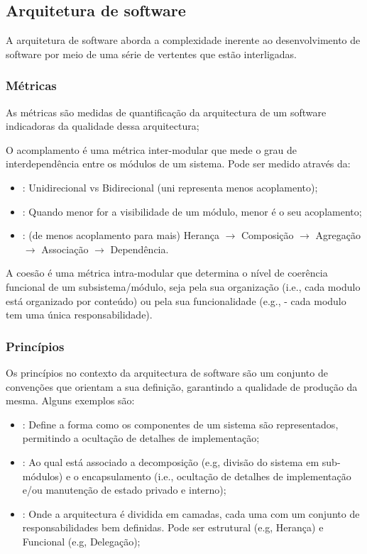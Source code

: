 \subsection{Arquitetura de software}\label{subsec:arquitetura-de-software}

A arquitetura de software aborda a complexidade inerente ao desenvolvimento de software por meio de uma série de vertentes que estão interligadas. 

\subsubsection{Métricas}\label{subsubsec:acoplamento}

As métricas são medidas de quantificação da arquitectura de um software indicadoras da qualidade dessa arquitectura;

O acomplamento é uma métrica inter-modular que mede o grau de interdependência entre os módulos de um sistema. Pode ser medido através da:
\begin{itemize}[topsep=0pt,itemsep=0pt,partopsep=0pt, parsep=0pt]
    \item {}: Unidirecional vs Bidirecional (uni representa menos acoplamento);
    \item {}: Quando menor for a visibilidade de um módulo, menor é o  seu acoplamento;
    \item {}: (de menos acoplamento para mais) Herança $\rightarrow$ Composição $\rightarrow$ Agregação $\rightarrow$ Associação $\rightarrow$ Dependência.
\end{itemize}

A coesão é uma métrica intra-modular que determina o nível de coerência funcional de um subsistema/módulo, seja pela sua organização (i.e., cada modulo está organizado por conteúdo) ou pela sua funcionalidade (e.g.,  - cada modulo tem uma única responsabilidade).

\subsubsection{Princípios}\label{subsubsec:principios}

Os princípios no contexto da arquitectura de software são um conjunto de convenções que orientam a sua definição, garantindo a qualidade de produção da mesma. Alguns exemplos são:
\begin{itemize}[topsep=0pt,itemsep=0pt,partopsep=0pt, parsep=0pt]
    \item {}: Define a forma como os componentes de um sistema são representados, permitindo a ocultação de detalhes de implementação;
    \item {}: Ao qual está associado a decomposição (e.g, divisão do sistema em sub-módulos) e o encapsulamento (i.e., ocultação de detalhes de implementação e/ou manutenção de estado privado e interno);
    \item {}: Onde a arquitectura é dividida em camadas, cada uma com um conjunto de responsabilidades bem definidas. Pode ser estrutural (e.g, Herança) e Funcional (e.g, Delegação);
\end{itemize}
    
